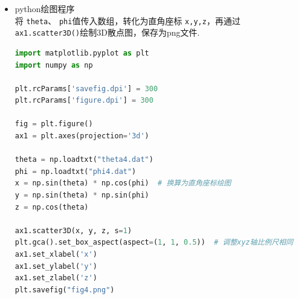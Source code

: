 \documentclass[12pt,a4paper,utf8]{ctexart}
\begin{document}
\begin{itemize}
\item python绘图程序\\
将 \texttt{theta}、 \texttt{phi}值传入数组，转化为直角座标
\texttt{x,y,z}，再通过 \texttt{ax1.scatter3D()}绘制3D散点图，保存为png文件.

\begin{framed}
\begin{lstlisting}[language=python]
import matplotlib.pyplot as plt
import numpy as np

plt.rcParams['savefig.dpi'] = 300
plt.rcParams['figure.dpi'] = 300

fig = plt.figure()
ax1 = plt.axes(projection='3d')

theta = np.loadtxt("theta4.dat")
phi = np.loadtxt("phi4.dat")
x = np.sin(theta) * np.cos(phi)  # 换算为直角座标绘图
y = np.sin(theta) * np.sin(phi)
z = np.cos(theta)

ax1.scatter3D(x, y, z, s=1)
plt.gca().set_box_aspect(aspect=(1, 1, 0.5))  # 调整xyz轴比例尺相同
ax1.set_xlabel('x')
ax1.set_ylabel('y')
ax1.set_zlabel('z')
plt.savefig("fig4.png")
\end{lstlisting}
\end{framed}
\end{itemize}

\newpage
\end{document}
